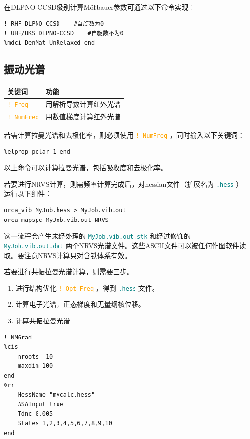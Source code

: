 \documentclass{ctexart}
\newcommand{\cmd}[1]{ \textcolor{orange}{\texttt{#1}} }
\newcommand{\file}[1]{ \textcolor{teal}{\texttt{#1}} }
\begin{document}
	在DLPNO-CCSD级别计算Mößbauer参数可通过以下命令实现：
	\begin{lstlisting}
! RHF DLPNO-CCSD	#自旋数为0
! UHF/UKS DLPNO-CCSD	#自旋数不为0
%mdci DenMat UnRelaxed end
	\end{lstlisting}
	
	\subsection{振动光谱} 
	
	\begin{table}[H]
		\centering
		\begin{tabular}{ll}
			\toprule
			\textbf{关键词}         & \textbf{功能 }         \\
			\midrule
			\cmd{! Freq}   & 用解析导数计算红外光谱 \\
			\cmd{! NumFreq} & 用数值梯度计算红外光谱\\
			\bottomrule
		\end{tabular}
	\end{table}
	
	若需计算拉曼光谱和去极化率，则必须使用\cmd{! NumFreq}，同时输入以下关键词：
	
	\begin{lstlisting}
%elprop polar 1 end
	\end{lstlisting}
	
	以上命令可以计算拉曼光谱，包括吸收度和去极化率。
	
	若要进行NRVS计算，则需频率计算完成后，对hessian文件（扩展名为\file{.hess}）运行以下组件：
	
	\begin{lstlisting}
orca_vib MyJob.hess > MyJob.vib.out 
orca_mapspc MyJob.vib.out NRVS
	\end{lstlisting}
	
	这一流程会产生未经处理的\file{MyJob.vib.out.stk}和经过修饰的\file{MyJob.vib.out.dat}两个NRVS光谱文件。这些ASCII文件可以被任何作图软件读取。要注意NRVS计算只对含铁体系有效。
	
	若要进行共振拉曼光谱计算，则需要三步。
	\begin{enumerate}[1.]
		\item 进行结构优化\cmd{! Opt Freq}，得到\file{.hess}文件。
		\item 计算电子光谱，正态梯度和无量纲核位移。
		\item 计算共振拉曼光谱
	\end{enumerate}

	\begin{lstlisting}
! NMGrad
%cis 
	nroots	10	
	maxdim 100
end
%rr
	HessName "mycalc.hess"
	ASAInput true
	Tdnc 0.005
	States 1,2,3,4,5,6,7,8,9,10
end
	\end{lstlisting}
	
\end{document}
